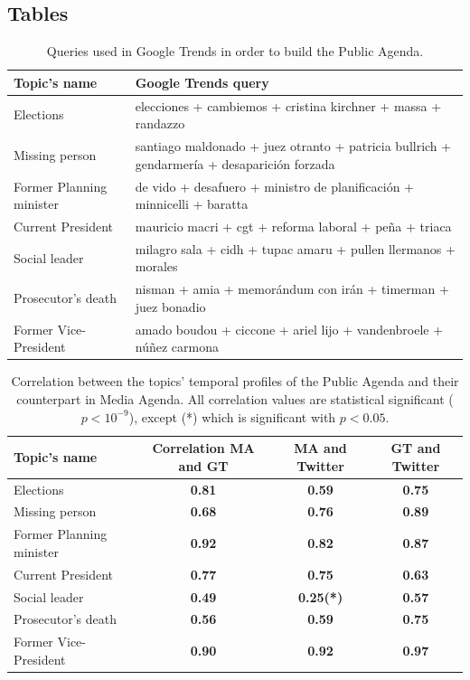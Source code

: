\documentclass{bmcart}
\begin{document}
\begin{backmatter}
\section*{Tables}

\begin{table}[h!]
\caption{Queries used in Google Trends in order to build the Public Agenda.}
\begin{tabular}{ll}
Topic's name & Google Trends query \\ \hline
Elections & elecciones + cambiemos + cristina kirchner + massa + randazzo \\
Missing person & santiago maldonado + juez otranto + patricia bullrich + gendarmería + desaparici\'on forzada \\
Former Planning minister & de vido + desafuero + ministro de planificaci\'on + minnicelli + baratta \\
Current President & mauricio macri + cgt + reforma laboral + peña + triaca \\
Social leader & milagro sala + cidh + tupac amaru + pullen llermanos + morales \\
Prosecutor's death & nisman + amia + memor\'andum con ir\'an + timerman + juez bonadio \\
Former Vice-President & amado boudou + ciccone + ariel lijo + vandenbroele + núñez carmona \\
\end{tabular}
\label{table:gt_queries}
\end{table}

\begin{table}[h!]
\caption{Correlation between the topics' temporal profiles of the Public Agenda and their counterpart in Media Agenda.
All correlation values are statistical significant ($p < 10^{-9}$), except (*) which is significant with $p < 0.05$.}
\begin{tabular}{lccc}
Topic's name & Correlation MA and GT & MA and Twitter & GT and Twitter \\ \hline
Elections & \textbf{0.81} & \textbf{0.59} & \textbf{0.75} \\
Missing person & \textbf{0.68} & \textbf{0.76} & \textbf{0.89} \\
Former Planning minister & \textbf{0.92} & \textbf{0.82} & \textbf{0.87} \\
Current President & \textbf{0.77} & \textbf{0.75} & \textbf{0.63} \\
Social leader & \textbf{0.49} & \textbf{0.25(*)} & \textbf{0.57} \\
Prosecutor's death & \textbf{0.56} & \textbf{0.59} & \textbf{0.75} \\
Former Vice-President & \textbf{0.90} & \textbf{0.92} & \textbf{0.97}\\
\end{tabular}
\label{table:gt_all_correlation}
\end{table}


\end{backmatter}
\end{document}
